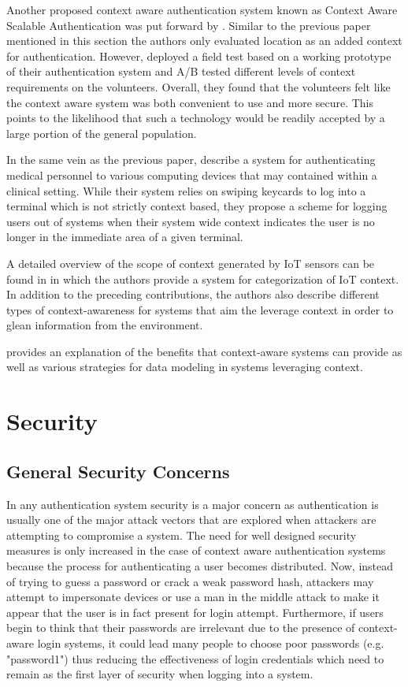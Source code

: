 \documentclass[11pt,journal]{IEEEtran}
\begin{document}
Another proposed context aware authentication system known as Context Aware Scalable Authentication was put forward by \citet{hayashi2013casa}.  Similar to the previous paper mentioned in this section the authors only evaluated location as an added context for authentication.  However, \citet{hayashi2013casa} deployed a field test based on a working prototype of their authentication system and A/B tested different levels of context requirements on the volunteers.  Overall, they found that the volunteers felt like the context aware system was both convenient to use and more secure.  This points to the likelihood that such a technology would be readily accepted by a large portion of the general population. 

In the same vein as the previous paper, \citet{bardram2003context} describe a system for authenticating medical personnel to various computing devices that may contained within a clinical setting.  While their system relies on swiping keycards to log into a terminal which is not strictly context based, they propose a scheme for logging users out of systems when their system wide context indicates the user is no longer in the immediate area of a given terminal.

A detailed overview of the scope of context generated by IoT sensors can be found in \citet{Habib:2015} in which the authors provide a system for categorization of IoT context.  In addition to the preceding contributions, the authors also describe different types of context-awareness for systems that aim the leverage context in order to glean information from the environment.

\citet{strang2004context} provides an explanation of the benefits that context-aware systems can provide as well as various strategies for data modeling in systems leveraging context. 


\section{Security}

\subsection{General Security Concerns}
In any authentication system security is a major concern as authentication is usually one of the major attack vectors that are explored when attackers are attempting to compromise a system.  The need for well designed security measures is only increased in the case of context aware authentication systems because the process for authenticating a user becomes distributed.  Now, instead of trying to guess a password or crack a weak password hash, attackers may attempt to impersonate devices or use a man in the middle attack to make it appear that the user is in fact present for login attempt.  Furthermore, if users begin to think that their passwords are irrelevant due to the presence of context-aware login systems, it could lead many people to choose poor passwords (e.g. "password1") thus reducing the effectiveness of login credentials which need to remain as the first layer of security when logging into a system.
\end{document}
